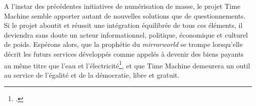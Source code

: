 A l'instar des précédentes initiatives de numérisation de masse, le projet Time Machine semble apporter autant de nouvelles solutions que de questionnements. Si le projet aboutit et réussit une intégration équilibrée de tous ces éléments, il deviendra sans doute un acteur informationnel, politique, économique et culturel de poids. Espérons alors, que la prophétie du \textit{mirrorworld} se trompe lorsqu'elle décrit les futurs services développés comme appelés à devenir des biens payants au même titre que l'eau et l'électricité\footcite{kelly_ar_2019}, et que Time Machine demeurera un outil au service de l'égalité et de la démocratie, libre et gratuit.